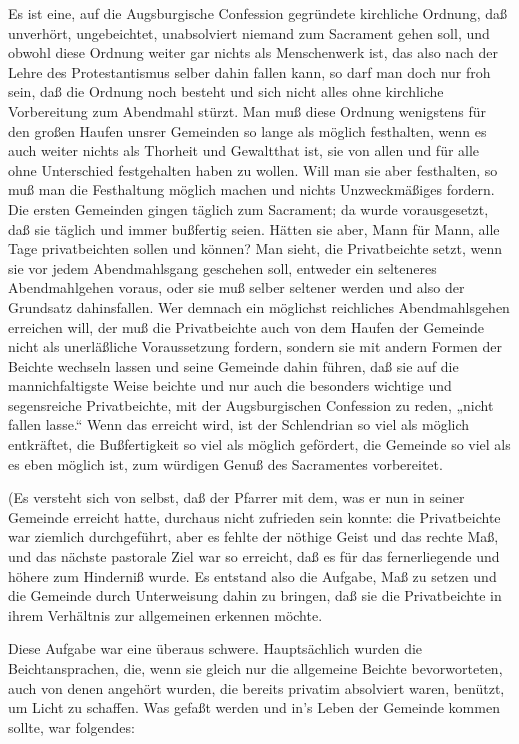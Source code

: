 Es ist eine, auf die Augsburgische Confession gegründete kirchliche Ordnung, daß unverhört, ungebeichtet, unabsolviert niemand zum Sacrament gehen soll, und obwohl diese Ordnung weiter gar nichts als Menschenwerk ist, das also nach der Lehre des Protestantismus selber dahin fallen kann, so darf man doch nur froh sein, daß die Ordnung noch besteht
und sich nicht alles ohne kirchliche Vorbereitung zum Abendmahl stürzt. Man muß diese Ordnung wenigstens für den großen Haufen unsrer Gemeinden so lange als möglich festhalten, wenn es auch weiter nichts als Thorheit und Gewaltthat ist, sie von allen und für alle ohne Unterschied festgehalten haben zu wollen. Will man sie aber festhalten, so muß man die Festhaltung möglich machen und nichts Unzweckmäßiges fordern. Die ersten Gemeinden gingen täglich zum Sacrament; da wurde vorausgesetzt, daß sie täglich und immer bußfertig seien. Hätten sie aber, Mann für Mann, alle Tage privatbeichten sollen und können? Man sieht, die Privatbeichte setzt, wenn sie vor jedem Abendmahlsgang geschehen soll, entweder ein selteneres Abendmahlgehen voraus, oder sie muß selber seltener werden und also der Grundsatz dahinsfallen. Wer demnach ein möglichst reichliches Abendmahlsgehen erreichen will, der muß die Privatbeichte auch von dem Haufen der Gemeinde nicht als unerläßliche Voraussetzung fordern, sondern sie mit andern Formen der Beichte wechseln lassen und seine Gemeinde dahin führen, daß sie auf die mannichfaltigste Weise beichte und nur auch die besonders wichtige und segensreiche Privatbeichte, mit der Augsburgischen Confession zu reden, „nicht fallen lasse.“ Wenn das erreicht wird, ist der Schlendrian so viel als möglich entkräftet, die Bußfertigkeit so viel als möglich gefördert, die Gemeinde so viel als es eben möglich ist, zum würdigen Genuß des Sacramentes vorbereitet.

(Es versteht sich von selbst, daß der Pfarrer mit dem, was er nun in seiner Gemeinde erreicht hatte, durchaus nicht
zufrieden sein konnte: die Privatbeichte war ziemlich durchgeführt, aber es fehlte der nöthige Geist und das rechte Maß, und das nächste pastorale Ziel war so erreicht, daß es für das fernerliegende und höhere zum Hinderniß wurde. Es entstand also die Aufgabe, Maß zu setzen und die Gemeinde durch Unterweisung dahin zu bringen, daß sie die Privatbeichte in ihrem Verhältnis zur allgemeinen erkennen möchte.

Diese Aufgabe war eine überaus schwere. Hauptsächlich wurden die Beichtansprachen, die, wenn sie gleich nur die allgemeine Beichte bevorworteten, auch von denen angehört wurden, die bereits privatim absolviert waren, benützt, um Licht zu schaffen. Was gefaßt werden und in’s Leben der Gemeinde kommen sollte, war folgendes:

